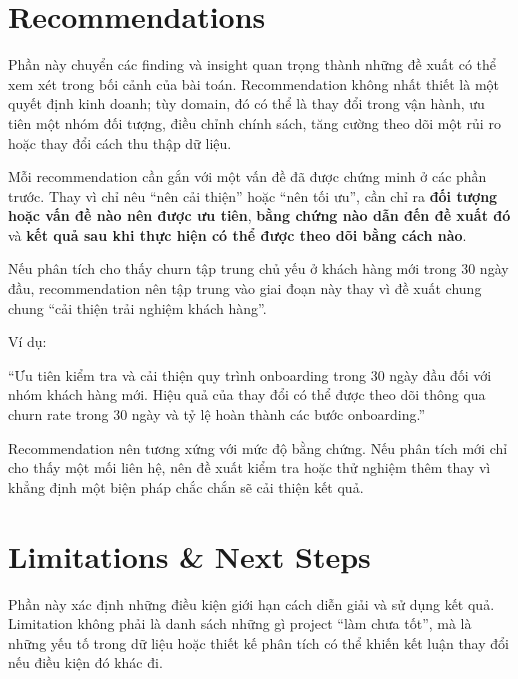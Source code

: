 \documentclass[12pt]{eDA_conquer2026}
\begin{document}

\section{Recommendations}

Phần này chuyển các finding và insight quan trọng thành những đề xuất có thể xem xét trong bối cảnh của bài toán. Recommendation không nhất thiết là một quyết định kinh doanh; tùy domain, đó có thể là thay đổi trong vận hành, ưu tiên một nhóm đối tượng, điều chỉnh chính sách, tăng cường theo dõi một rủi ro hoặc thay đổi cách thu thập dữ liệu.

Mỗi recommendation cần gắn với một vấn đề đã được chứng minh ở các phần trước. Thay vì chỉ nêu ``nên cải thiện'' hoặc ``nên tối ưu'', cần chỉ ra \textbf{đối tượng hoặc vấn đề nào nên được ưu tiên}, \textbf{bằng chứng nào dẫn đến đề xuất đó} và \textbf{kết quả sau khi thực hiện có thể được theo dõi bằng cách nào}.

\begin{aivncodebox}
Nếu phân tích cho thấy churn tập trung chủ yếu ở khách hàng mới trong 30 ngày đầu, recommendation nên tập trung vào giai đoạn này thay vì đề xuất chung chung ``cải thiện trải nghiệm khách hàng''.

Ví dụ:

``Ưu tiên kiểm tra và cải thiện quy trình onboarding trong 30 ngày đầu đối với nhóm khách hàng mới. Hiệu quả của thay đổi có thể được theo dõi thông qua churn rate trong 30 ngày và tỷ lệ hoàn thành các bước onboarding.''
\end{aivncodebox}

Recommendation nên tương xứng với mức độ bằng chứng. Nếu phân tích mới chỉ cho thấy một mối liên hệ, nên đề xuất kiểm tra hoặc thử nghiệm thêm thay vì khẳng định một biện pháp chắc chắn sẽ cải thiện kết quả.


\newpage
\section{Limitations \& Next Steps}

Phần này xác định những điều kiện giới hạn cách diễn giải và sử dụng kết quả. Limitation không phải là danh sách những gì project ``làm chưa tốt'', mà là những yếu tố trong dữ liệu hoặc thiết kế phân tích có thể khiến kết luận thay đổi nếu điều kiện đó khác đi.
\end{document}
